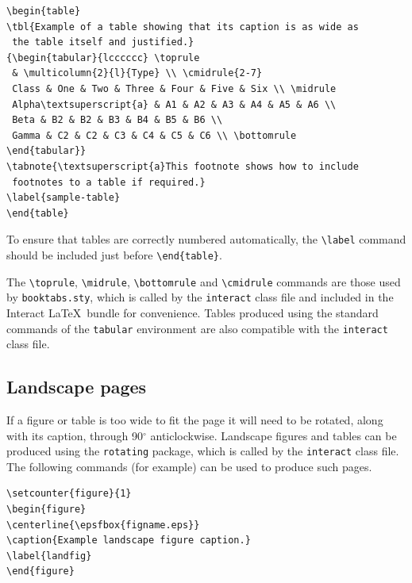 \documentclass[]{interact}
\theoremstyle{plain}%
\theoremstyle{definition}
\theoremstyle{remark}
\begin{document}
\begin{verbatim}
\begin{table}
\tbl{Example of a table showing that its caption is as wide as
 the table itself and justified.}
{\begin{tabular}{lcccccc} \toprule
 & \multicolumn{2}{l}{Type} \\ \cmidrule{2-7}
 Class & One & Two & Three & Four & Five & Six \\ \midrule
 Alpha\textsuperscript{a} & A1 & A2 & A3 & A4 & A5 & A6 \\
 Beta & B2 & B2 & B3 & B4 & B5 & B6 \\
 Gamma & C2 & C2 & C3 & C4 & C5 & C6 \\ \bottomrule
\end{tabular}}
\tabnote{\textsuperscript{a}This footnote shows how to include
 footnotes to a table if required.}
\label{sample-table}
\end{table}
\end{verbatim}

To ensure that tables are correctly numbered automatically, the
\texttt{\textbackslash{}label} command should be included just before
\texttt{\textbackslash{}end\{table\}}.

The \texttt{\textbackslash{}toprule}, \texttt{\textbackslash{}midrule},
\texttt{\textbackslash{}bottomrule} and
\texttt{\textbackslash{}cmidrule} commands are those used by
\texttt{booktabs.sty}, which is called by the \texttt{interact} class
file and included in the \textsf{Interact} \LaTeX~bundle for
convenience. Tables produced using the standard commands of the
\texttt{tabular} environment are also compatible with the
\texttt{interact} class file.

\hypertarget{landscape-pages}{%
\subsection{Landscape pages}\label{landscape-pages}}

If a figure or table is too wide to fit the page it will need to be
rotated, along with its caption, through 90\(^{\circ}\) anticlockwise.
Landscape figures and tables can be produced using the \texttt{rotating}
package, which is called by the \texttt{interact} class file. The
following commands (for example) can be used to produce such pages.

\begin{verbatim}
\setcounter{figure}{1}
\begin{figure}
\centerline{\epsfbox{figname.eps}}
\caption{Example landscape figure caption.}
\label{landfig}
\end{figure}
\end{verbatim}
\end{document}
